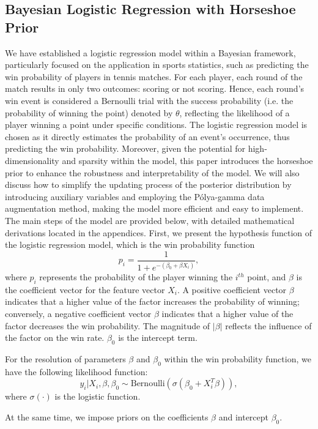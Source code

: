 \documentclass{mcmthesis}
\begin{document}
\subsection{Bayesian Logistic Regression with Horseshoe Prior}
We have established a logistic regression model within a Bayesian framework, particularly focused on the application in sports statistics, such as predicting the win probability of players in tennis matches. For each player, each round of the match results in only two outcomes: scoring or not scoring. Hence, each round's win event is considered a Bernoulli trial with the success probability (i.e. the probability of winning the point) denoted by $\theta$, reflecting the likelihood of a player winning a point under specific conditions. The logistic regression model is chosen as it directly estimates the probability of an event's occurrence, thus predicting the win probability. Moreover, given the potential for high-dimensionality and sparsity within the model, this paper introduces the horseshoe prior to enhance the robustness and interpretability of the model. We will also discuss how to simplify the updating process of the posterior distribution by introducing auxiliary variables and employing the Pólya-gamma data augmentation method, making the model more efficient and easy to implement. The main steps of the model are provided below, with detailed mathematical derivations located in the appendices.
First, we present the hypothesis function of the logistic regression model, which is the win probability function
$$
p_i = \frac{1}{1 + e^{-(\beta_0 + \beta X_i)}},
$$
where $p_i$ represents the probability of the player winning the $i^{th}$ point, and $\beta$ is the coefficient vector for the feature vector $X_i$. A positive coefficient vector $\beta$ indicates that a higher value of the factor increases the probability of winning; conversely, a negative coefficient vector $\beta$ indicates that a higher value of the factor decreases the win probability. The magnitude of $|\beta|$ reflects the influence of the factor on the win rate. $\beta_0$ is the intercept term.

For the resolution of parameters $\beta$ and $\beta_0$ within the win probability function, we have the following likelihood function:
$$
y_i | X_i, \beta, \beta_0 \sim \text{Bernoulli}\left(\sigma(\beta_0 + X_i^T\beta)\right),
$$
where $\sigma(\cdot)$ is the logistic function.

At the same time, we impose priors on the coefficients $\beta$ and intercept $\beta_0$.
\end{document}
